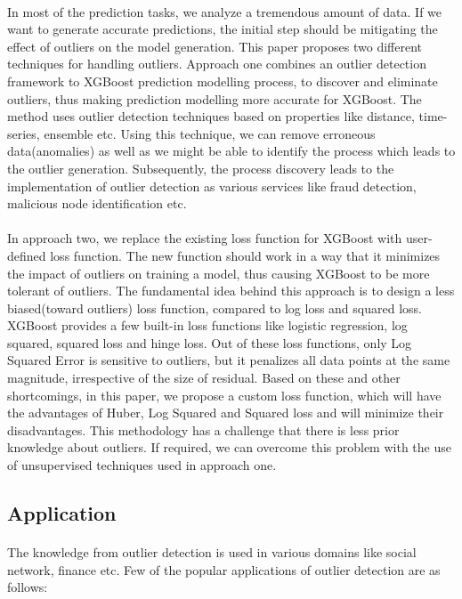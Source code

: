 \documentclass[runningheads]{llncs}
\begin{document}
\paragraph{} In most of the prediction tasks, we analyze a tremendous amount of data. If we want to generate accurate predictions, the initial step should be mitigating the effect of outliers on the model generation. This paper proposes two different techniques for handling outliers. Approach one combines an outlier detection framework to XGBoost prediction modelling process, to discover and eliminate outliers, thus making prediction modelling more accurate for XGBoost. The method uses outlier detection techniques based on properties like distance, time-series, ensemble etc. Using this technique, we can remove erroneous data(anomalies) as well as we might be able to identify the process which leads to the outlier generation. Subsequently, the process discovery leads to the implementation of outlier detection as various services like fraud detection, malicious node identification etc. 

\paragraph{}In approach two, we replace the existing loss function for XGBoost with user-defined loss function. The new function should work in a way that it minimizes the impact of outliers on training a model, thus causing XGBoost to be more tolerant of outliers. The fundamental idea behind this approach is to design a less biased(toward outliers) loss function, compared to log loss and squared loss. XGBoost provides a few built-in loss functions like logistic regression, log squared, squared loss and hinge loss. Out of these loss functions, only Log Squared Error is sensitive to outliers, but it penalizes all data points at the same magnitude, irrespective of the size of residual. Based on these and other shortcomings, in this paper, we propose a custom loss function, which will have the advantages of Huber, Log Squared and Squared loss and will minimize their disadvantages. This methodology has a challenge that there is less prior knowledge about outliers. If required, we can overcome this problem with the use of unsupervised techniques used in approach one.

\subsection{Application}
\paragraph{}The knowledge from outlier detection is used in various domains like social network,  finance etc. Few of the popular applications of outlier detection are as follows:
\end{document}
